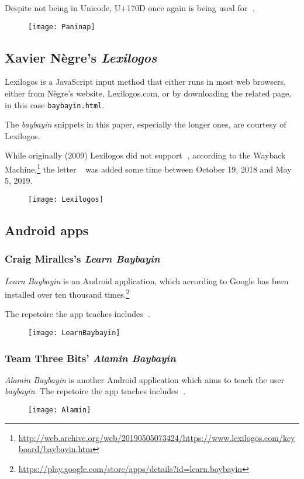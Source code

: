 \documentclass[a4paper,pagesize,openany,14pt,parskip=never]{scrbook}
\newcommand{\≈}{$\approx$}
\newcommand{\ra}{{\baybayin ᜍ}}
\begin{document}
Despite not being in Unicode, U+170D once again is being used for \ra.

\begin{figure}[H]
\texttt{[image: Paninap]}
\end{figure}

\newpage
\subsection{Xavier Nègre's {\em Lexilogos}}
\label{Lexilogos}

Lexilogos is a JavaScript input method that either runs in most web browsers, either from Nègre's website, Lexilogos.com, or by downloading the related page, in this case \texttt{baybayin.html}.

The {\em baybayin} snippets in this paper, especially the longer ones, are courtesy of Lexilogos.

While originally (2009) Lexilogos did not support \ra, according to the Wayback Machine,\footnote{\url{http://web.archive.org/web/20190505073424/https://www.lexilogos.com/keyboard/baybayin.htm}} the letter \ra\ was added some time between October 19, 2018 and May 5, 2019.

\begin{figure}[H]
\texttt{[image: Lexilogos]}
\end{figure}

\newpage
\subsection{Android apps}
\label{Android}
\subsubsection{Craig Miralles's {\em Learn Baybayin}}

{\em Learn Baybayin} is an Android application, which according to Google has been installed over ten thousand times.\footnote{\url{https://play.google.com/store/apps/details?id=learn.baybayin}}

The repetoire the app teaches includes \ra.

\begin{figure}[H]
\texttt{[image: LearnBaybayin]}
\end{figure}

\subsubsection{Team Three Bits' {\em Alamin Baybayin}}

{\em Alamin Baybayin} is another Android application which aims to teach the user {\em baybayin}. The repetoire the app teaches includes \ra.

\begin{figure}[H]
\texttt{[image: Alamin]}
\end{figure}
\end{document}

